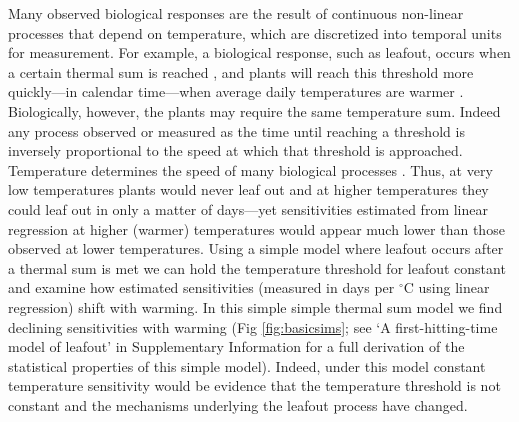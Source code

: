 \documentclass[11pt,letter]{article}
\begin{document}
Many observed biological responses are the result of continuous non-linear processes that depend on temperature, which are discretized into temporal units for measurement. For example, a biological response, such as leafout, occurs when a certain thermal sum is reached \citep{dij1956,lindsey1956}, and plants will reach this threshold more quickly---in calendar time---when average daily temperatures are warmer \citep[Fig. \ref{fig:ospreewsims},][]{kramer2012book}. 
Biologically, however, the plants may require the same temperature sum. Indeed any process observed or measured as the time until reaching a threshold is inversely proportional to the speed at which that threshold is approached. \\

Temperature determines the speed of many biological processes \citep{bonan1992,hofmann2010}. Thus, at very low temperatures plants would never leaf out and at higher temperatures they could leaf out in only a matter of days---yet sensitivities estimated from linear regression at higher (warmer) temperatures would appear much lower than those observed at lower temperatures. Using a simple model where leafout occurs after a thermal sum is met we can hold the temperature threshold for leafout constant \citep{Hunter:1992jw,zohner2020gcb} and examine how estimated sensitivities (measured in days per $^{\circ}$C using linear regression) shift with warming. In this simple simple thermal sum model \citep[which we argue is the null model for studies of biological events across different temperatures, Fig. \ref{fig:ospreewsims} and][]{dij1956,lindsey1956,zohner2020gcb} we find declining sensitivities with warming (Fig \ref{fig:basicsims}; see `A first-hitting-time model of leafout' in Supplementary Information for a full derivation of the statistical properties of this simple model). Indeed, under this model constant temperature sensitivity would be evidence that the temperature threshold is not constant and the mechanisms underlying the leafout process have changed. \\
\end{document}
